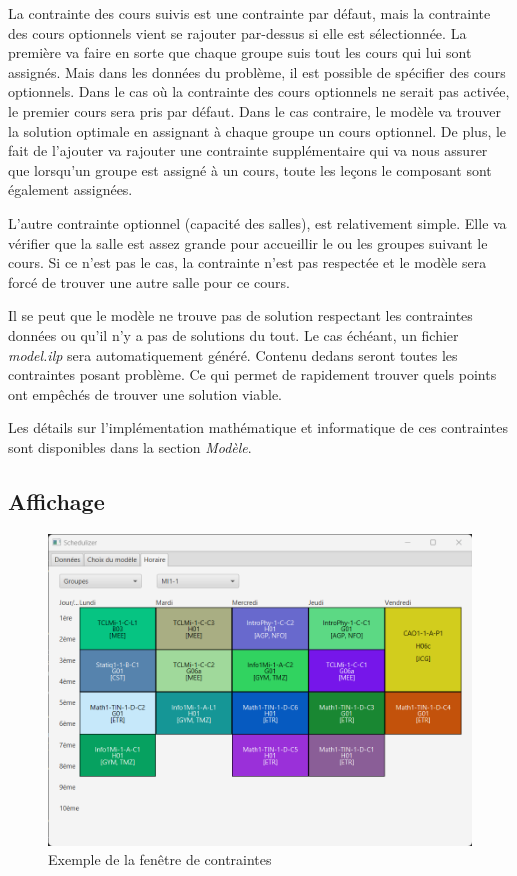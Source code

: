 La contrainte des cours suivis est une contrainte par défaut, mais la contrainte des cours optionnels vient se rajouter par-dessus si elle est sélectionnée. La première va faire en sorte que chaque groupe suis tout les cours qui lui sont assignés. Mais dans les données du problème, il est possible de spécifier des cours optionnels. Dans le cas où la contrainte des cours optionnels ne serait pas activée, le premier cours sera pris par défaut. Dans le cas contraire, le modèle va trouver la solution optimale en assignant à chaque groupe un cours optionnel. De plus, le fait de l'ajouter va rajouter une contrainte supplémentaire qui va nous assurer que lorsqu'un groupe est assigné à un cours, toute les leçons le composant sont également assignées.

L'autre contrainte optionnel (capacité des salles), est relativement simple. Elle va vérifier que la salle est assez grande pour accueillir le ou les groupes suivant le cours. Si ce n'est pas le cas, la contrainte n'est pas respectée et le modèle sera forcé de trouver une autre salle pour ce cours.

Il se peut que le modèle ne trouve pas de solution respectant les contraintes données ou qu'il n'y a pas de solutions du tout. Le cas échéant, un fichier \textit{model.ilp} sera automatiquement généré. Contenu dedans seront toutes les contraintes posant problème. Ce qui permet de rapidement trouver quels points ont empêchés de trouver une solution viable.

Les détails sur l'implémentation mathématique et informatique de ces contraintes sont disponibles dans la section \textit{Modèle}.

\subsection{Affichage}

\begin{figure}[H]
    \centering
    \includegraphics[width=1\textwidth]{./assets/figures/scheduleWindow.png}
    \caption{Exemple de la fenêtre de contraintes}
\end{figure}

